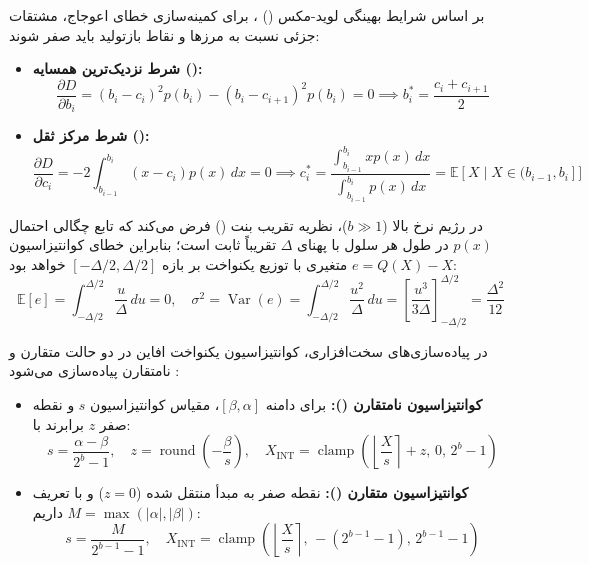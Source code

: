 بر اساس شرایط بهینگی لوید-مکس () \cite{lloyd1982least, max1960quantizing}، برای کمینه‌سازی خطای اعوجاج، مشتقات جزئی نسبت به مرزها و نقاط بازتولید باید صفر شوند:
\begin{itemize}
    \item \textbf{شرط نزدیک‌ترین همسایه ():}
    \begin{equation}
        \frac{\partial D}{\partial b_i} = (b_i - c_i)^2 p(b_i) - (b_i - c_{i+1})^2 p(b_i) = 0 \implies b_i^* = \frac{c_i + c_{i+1}}{2}
    \end{equation}
    \item \textbf{شرط مرکز ثقل ():}
    \begin{equation}
        \frac{\partial D}{\partial c_i} = -2 \int_{b_{i-1}}^{b_i} (x - c_i) p(x) \, dx = 0 \implies c_i^* = \frac{\int_{b_{i-1}}^{b_i} x p(x) \, dx}{\int_{b_{i-1}}^{b_i} p(x) \, dx} = \mathbb{E}[X \mid X \in (b_{i-1}, b_i]]
    \end{equation}
\end{itemize}

در رژیم نرخ بالا ($b \gg 1$)، نظریه تقریب بنت () \cite{bennett1948spectra} فرض می‌کند که تابع چگالی احتمال $p(x)$ در طول هر سلول با پهنای $\Delta$ تقریباً ثابت است؛ بنابراین خطای کوانتیزاسیون $e = Q(X) - X$ متغیری با توزیع یکنواخت بر بازه $[-\Delta/2, \Delta/2]$ خواهد بود:
\begin{equation}
    \mathbb{E}[e] = \int_{-\Delta/2}^{\Delta/2} \frac{u}{\Delta} \, du = 0, \quad \sigma^2 = \operatorname{Var}(e) = \int_{-\Delta/2}^{\Delta/2} \frac{u^2}{\Delta} \, du = \left[ \frac{u^3}{3\Delta} \right]_{-\Delta/2}^{\Delta/2} = \frac{\Delta^2}{12}
\end{equation}

در پیاده‌سازی‌های سخت‌افزاری، کوانتیزاسیون یکنواخت افاین در دو حالت متقارن و نامتقارن پیاده‌سازی می‌شود \cite{jorgensen2025resource}:
\begin{itemize}
    \item \textbf{کوانتیزاسیون نامتقارن ():} برای دامنه $[\beta, \alpha]$، مقیاس کوانتیزاسیون $s$ و نقطه صفر $z$ برابرند با:
    \begin{equation}
        s = \frac{\alpha - \beta}{2^b - 1}, \quad z = \operatorname{round}\left(-\frac{\beta}{s}\right), \quad X_{\text{INT}} = \operatorname{clamp}\left(\left\lfloor \frac{X}{s} \right\rceil + z, \, 0, \, 2^b - 1\right)
    \end{equation}
    \item \textbf{کوانتیزاسیون متقارن ():} نقطه صفر به مبدأ منتقل شده ($z = 0$) و با تعریف $M = \max(|\alpha|, |\beta|)$ داریم:
    \begin{equation}
        s = \frac{M}{2^{b-1} - 1}, \quad X_{\text{INT}} = \operatorname{clamp}\left(\left\lfloor \frac{X}{s} \right\rceil, \, -(2^{b-1} - 1), \, 2^{b-1} - 1\right)
    \end{equation}
\end{itemize}

